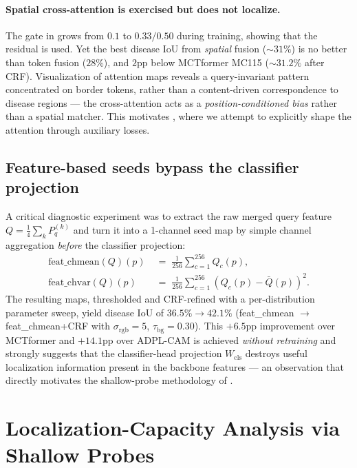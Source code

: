 \documentclass[11pt,a4paper]{article}
\begin{document}
\paragraph{Spatial cross-attention is exercised but does not localize.}
The gate in  grows from $0.1$ to $0.33/0.50$ during
training, showing that the residual is used. Yet the best disease IoU
from \emph{spatial} fusion (${\sim}31\%$) is no better than token fusion
($28\%$), and $2$pp below MCTformer MC115 (${\sim}31.2\%$ after CRF).
Visualization of attention maps reveals a query-invariant pattern
concentrated on border tokens, rather than a content-driven correspondence
to disease regions — the cross-attention acts as a
\emph{position-conditioned bias} rather than a spatial matcher. This motivates
, where we attempt to explicitly shape the attention through
auxiliary losses.

\subsection{Feature-based seeds bypass the classifier projection}

A critical diagnostic experiment was to extract the raw merged query
feature $Q\!=\!\frac14\sum_k P^{(k)}_q$ and turn it into a 1-channel
seed map by simple channel aggregation
\emph{before} the classifier projection:
\begin{align}
\mathrm{feat\_chmean}(Q)(p) &\;=\; \tfrac{1}{256}\textstyle\sum_{c=1}^{256} Q_c(p),\\
\mathrm{feat\_chvar}(Q)(p)  &\;=\; \tfrac{1}{256}\textstyle\sum_{c=1}^{256}\!\left(Q_c(p)-\bar Q(p)\right)^2.
\end{align}
The resulting maps, thresholded and CRF-refined with a per-distribution
parameter sweep, yield disease IoU of $36.5\%\to42.1\%$ (feat\_chmean
$\to$ feat\_chmean+CRF with $\sigma_{\mathrm{rgb}}{=}5$,
$\tau_{\mathrm{bg}}{=}0.30$). This $+6.5$pp improvement over MCTformer
and $+14.1$pp over ADPL-CAM is achieved \emph{without retraining} and
strongly suggests that the classifier-head projection $W_{\mathrm{cls}}$
destroys useful localization information present in the backbone
features — an observation that directly motivates the shallow-probe
methodology of .

\section{Localization-Capacity Analysis via Shallow Probes}
\label{sec:probe}
\end{document}
